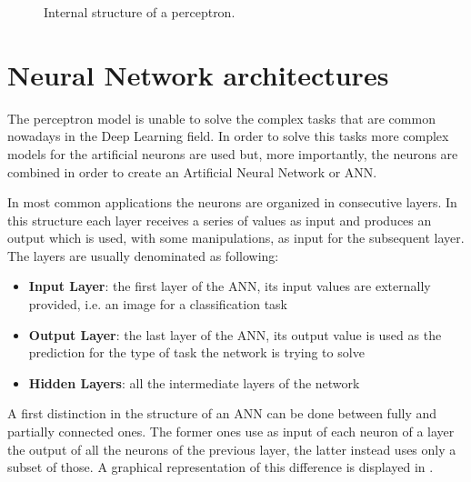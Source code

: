 \begin{figure}[h]
    \centering

\caption{Internal structure of a perceptron.}
    \label{fig:perceptron}
\end{figure}

\section{Neural Network architectures}

The perceptron model is unable to solve the complex tasks that are common nowadays in the Deep Learning field. In order to solve this tasks more complex models for the artificial neurons are used but, more importantly, the neurons are combined in order to create an Artificial Neural Network or ANN.

In most common applications the neurons are organized in consecutive layers.
In this structure each layer receives a series of values as input and produces an output which is used, with some manipulations, as input for the subsequent layer. The layers are usually denominated as following:
\begin{itemize}
    \item \textbf{Input Layer}: the first layer of the ANN, its input values are externally provided, i.e. an image for a classification task
    \item \textbf{Output Layer}: the last layer of the ANN, its output value is used as the prediction for the type of task the network is trying to solve
    \item \textbf{Hidden Layers}: all the intermediate layers of the network  
\end{itemize}

A first distinction in the structure of an ANN can be done between fully and partially connected ones. The former ones use as input of each neuron of a layer the output of all the neurons of the previous layer, the latter instead uses only a subset of those. A graphical representation of this difference is displayed in .

